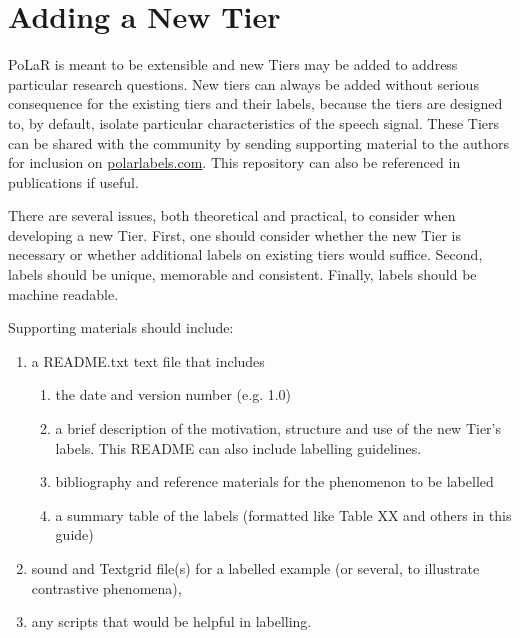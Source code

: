 \documentclass[11pt, twoside]{memoir}
\begin{document}
\section{Adding a New Tier}\label{sec:adding-a-new-tier}

PoLaR is meant to be extensible and new Tiers may be added to address particular research questions. New tiers can always be added without serious consequence for the existing tiers and their labels, because the tiers are designed to, by default, isolate particular characteristics of the speech signal. These Tiers can be shared with the community by sending  supporting material to the authors for inclusion on \href{https://www.polarlabels.com}{polarlabels.com}. This repository can also be referenced in publications if useful. 
 
There are several issues, both theoretical and practical, to consider when developing a new Tier. First, one should consider whether the new Tier is necessary or whether additional labels on existing tiers would suffice. Second, labels should be unique,  memorable and consistent. Finally, labels should be machine readable. 

Supporting materials should include:
\begin{enumerate}
	\item a README.txt text  file that includes
	\begin{enumerate}
		\item the date and version number (e.g. 1.0) 
		\item a brief description of the motivation, structure  and use of the new Tier’s labels. This README can also include labelling guidelines.
		\item bibliography and reference materials for the phenomenon to be labelled
		\item a summary table of the labels (formatted like Table XX and others in this guide)
	\end{enumerate}
	\item sound and Textgrid file(s) for a labelled example (or several, to illustrate contrastive phenomena),
	\item any scripts that would be helpful in labelling. 
\end{enumerate}
\end{document}
